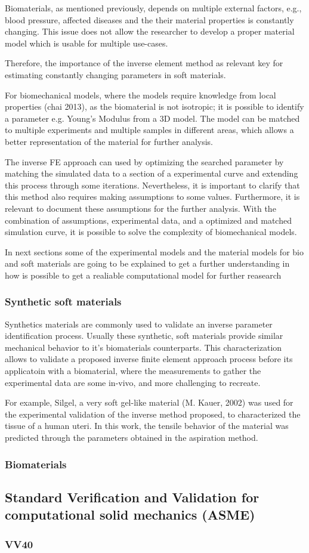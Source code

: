 Biomaterials, as mentioned previously, depends on multiple external factors, e.g., blood 
pressure, affected diseases and the their material properties is constantly changing. 
This issue does not allow the researcher to develop a proper material model which is 
usable for multiple use-cases. 

Therefore, the importance of the inverse element method as relevant key for estimating 
constantly changing parameters in soft materials.

For biomechanical models, where the models require knowledge from local properties (chai 2013),
as the biomaterial is not isotropic; it is possible to identify a parameter e.g. Young's Modulus 
from a 3D model. The model can be matched to multiple experiments and multiple samples in different areas,
which allows a better representation of the material for further analysis.

The inverse FE approach can used by optimizing the searched parameter by matching the simulated data
to a section of a experimental curve and extending this process through some iterations. 
Nevertheless, it is important to clarify that this method also requires making assumptions to some values.
Furthermore, it is relevant to document these assumptions for the further analysis. 
With the combination of assumptions, experimental data, and a optimized and matched simulation curve, it
is possible to solve the complexity of biomechanical models.
 
In next sections some of the experimental models and the material models for bio and soft materials are 
going to be explained to get a further understanding in how is possible to get a realiable computational 
model for further reasearch

\subsubsection{Synthetic soft materials}

Synthetics materials are commonly used to validate an inverse parameter identification process. 
Usually these synthetic, soft materials provide similar mechanical behavior to it's biomaterials 
counterparts. This characterization allows to validate a proposed inverse finite element approach process
before its applicatoin with a biomaterial, where the measurements to gather the experimental data are 
some in-vivo, and more challenging to recreate.

For example, Silgel, a very soft gel-like material (M. Kauer, 2002) was used for the experimental 
validation of the inverse method proposed, to characterized the tissue of a human uteri. In this 
work, the tensile behavior of the material was predicted through the parameters obtained in the 
aspiration method. 
\subsubsection{Biomaterials}




\subsection{Standard Verification and Validation for computational solid mechanics (ASME)}
\subsubsection{VV40}


